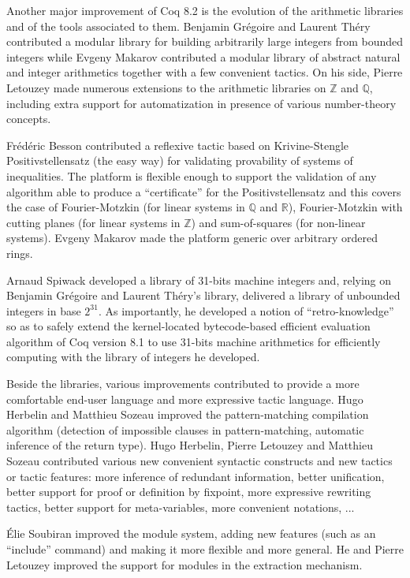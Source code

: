 Another major improvement of Coq 8.2 is the evolution of the
arithmetic libraries and of the tools associated to them. Benjamin
Grégoire and Laurent Théry contributed a modular library for building
arbitrarily large integers from bounded integers while Evgeny Makarov
contributed a modular library of abstract natural and integer
arithmetics together with a few convenient tactics. On his side,
Pierre Letouzey made numerous extensions to the arithmetic libraries on
$\mathbb{Z}$ and $\mathbb{Q}$, including extra support for
automatization in presence of various number-theory concepts.

Frédéric Besson contributed a reflexive tactic based on
Krivine-Stengle Positivstellensatz (the easy way) for validating
provability of systems of inequalities. The platform is flexible enough
to support the validation of any algorithm able to produce a
``certificate'' for the Positivstellensatz and this covers the case of
Fourier-Motzkin (for linear systems in $\mathbb{Q}$ and $\mathbb{R}$),
Fourier-Motzkin with cutting planes (for linear systems in
$\mathbb{Z}$) and sum-of-squares (for non-linear systems).  Evgeny
Makarov made the platform generic over arbitrary ordered rings.

Arnaud Spiwack developed a library of 31-bits machine integers and,
relying on Benjamin Grégoire and Laurent Théry's library, delivered a
library of unbounded integers in base $2^{31}$. As importantly, he
developed a notion of ``retro-knowledge'' so as to safely extend the
kernel-located bytecode-based efficient evaluation algorithm of Coq
version 8.1 to use 31-bits machine arithmetics for efficiently
computing with the library of integers he developed.

Beside the libraries, various improvements contributed to provide a
more comfortable end-user language and more expressive tactic
language. Hugo Herbelin and Matthieu Sozeau improved the
pattern-matching compilation algorithm (detection of impossible
clauses in pattern-matching, automatic inference of the return
type). Hugo Herbelin, Pierre Letouzey and Matthieu Sozeau contributed
various new convenient syntactic constructs and new tactics or tactic
features: more inference of redundant information, better unification,
better support for proof or definition by fixpoint, more expressive
rewriting tactics, better support for meta-variables, more convenient
notations, ...

Élie Soubiran improved the module system, adding new features (such as
an ``include'' command) and making it more flexible and more
general. He and Pierre Letouzey improved the support for modules in
the extraction mechanism.

